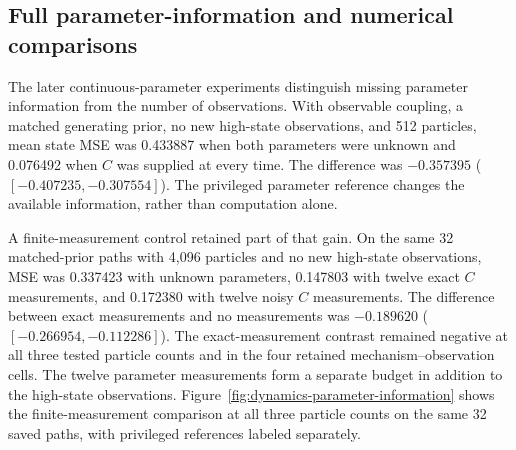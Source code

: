 \documentclass[11pt,a4paper]{article}
\begin{document}
\subsection{Full parameter-information and numerical comparisons}
\label{sec:parameters}


The later continuous-parameter experiments distinguish missing parameter information from the number of observations. With observable coupling, a matched generating prior, no new high-state observations, and 512 particles, mean state MSE was 0.433887 when both parameters were unknown and 0.076492 when $C$ was supplied at every time. The difference was $-0.357395$ ($[-0.407235,-0.307554]$). The privileged parameter reference changes the available information, rather than computation alone.

A finite-measurement control retained part of that gain. On the same 32 matched-prior paths with 4,096 particles and no new high-state observations, MSE was 0.337423 with unknown parameters, 0.147803 with twelve exact $C$ measurements, and 0.172380 with twelve noisy $C$ measurements. The difference between exact measurements and no measurements was $-0.189620$ ($[-0.266954,-0.112286]$). The exact-measurement contrast remained negative at all three tested particle counts and in the four retained mechanism--observation cells. The twelve parameter measurements form a separate budget in addition to the high-state observations. Figure~\ref{fig:dynamics-parameter-information} shows the finite-measurement comparison at all three particle counts on the same 32 saved paths, with privileged references labeled separately.
\end{document}
